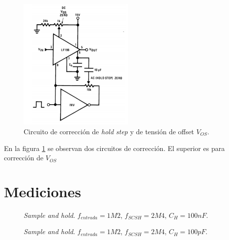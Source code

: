 \documentclass[../../ASSD_TP1_G7.tex]{subfiles}
\begin{document}
		\begin{figure}[H]
			\centering
			\includegraphics[width = 0.5\textwidth]{figures/offset_adjust_schematic.png}
			\caption{Circuito de correcci\'on de \textit{hold step} y de tensi\'on de offset $V_{OS}$.}
			\label{fig:syh_offset_correction_datasheet}
		\end{figure}	
		
		En la figura \ref{fig:syh_offset_correction_datasheet} se observan dos circuitos de correcci\'on. El superior es para correcci\'on de $V_{OS}$

\section{Mediciones}

\begin{figure}[H]
	\centering
	\begin{subfigure}[t]{0.45\linewidth}
		
	\end{subfigure}
	\begin{subfigure}[t]{0.45\linewidth}
		
	\end{subfigure}
	\caption{\textit{Sample and hold}. $f_{entrada} = 1M2$, $f_{SCSH}=2M4$, $C_H = 100nF$.}
\end{figure}

\begin{figure}[H]
	\centering
	\begin{subfigure}[t]{0.45\linewidth}
		
	\end{subfigure}
	\begin{subfigure}[t]{0.45\linewidth}
		
	\end{subfigure}
	\caption{\textit{Sample and hold}. $f_{entrada} = 1M2$, $f_{SCSH}=2M4$, $C_H = 100pF$.}
\end{figure}
\end{document}
